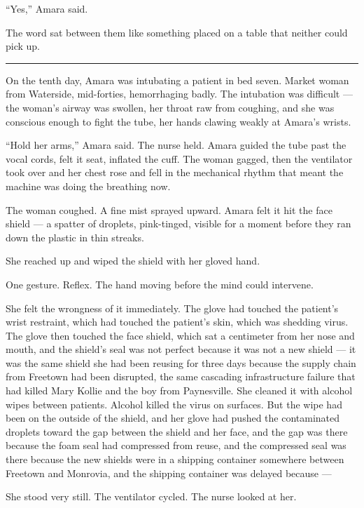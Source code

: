 ``Yes,'' Amara said.

The word sat between them like something placed on a table that neither could pick up.

\begin{center}\rule{0.3\linewidth}{0.4pt}\end{center}

On the tenth day, Amara was intubating a patient in bed seven. Market woman from Waterside, mid-forties, hemorrhaging badly. The intubation was difficult --- the woman's airway was swollen, her throat raw from coughing, and she was conscious enough to fight the tube, her hands clawing weakly at Amara's wrists.

``Hold her arms,'' Amara said. The nurse held. Amara guided the tube past the vocal cords, felt it seat, inflated the cuff. The woman gagged, then the ventilator took over and her chest rose and fell in the mechanical rhythm that meant the machine was doing the breathing now.

The woman coughed. A fine mist sprayed upward. Amara felt it hit the face shield --- a spatter of droplets, pink-tinged, visible for a moment before they ran down the plastic in thin streaks.

She reached up and wiped the shield with her gloved hand.

One gesture. Reflex. The hand moving before the mind could intervene.

She felt the wrongness of it immediately. The glove had touched the patient's wrist restraint, which had touched the patient's skin, which was shedding virus. The glove then touched the face shield, which sat a centimeter from her nose and mouth, and the shield's seal was not perfect because it was not a new shield --- it was the same shield she had been reusing for three days because the supply chain from Freetown had been disrupted, the same cascading infrastructure failure that had killed Mary Kollie and the boy from Paynesville. She cleaned it with alcohol wipes between patients. Alcohol killed the virus on surfaces. But the wipe had been on the outside of the shield, and her glove had pushed the contaminated droplets toward the gap between the shield and her face, and the gap was there because the foam seal had compressed from reuse, and the compressed seal was there because the new shields were in a shipping container somewhere between Freetown and Monrovia, and the shipping container was delayed because ---

She stood very still. The ventilator cycled. The nurse looked at her.

